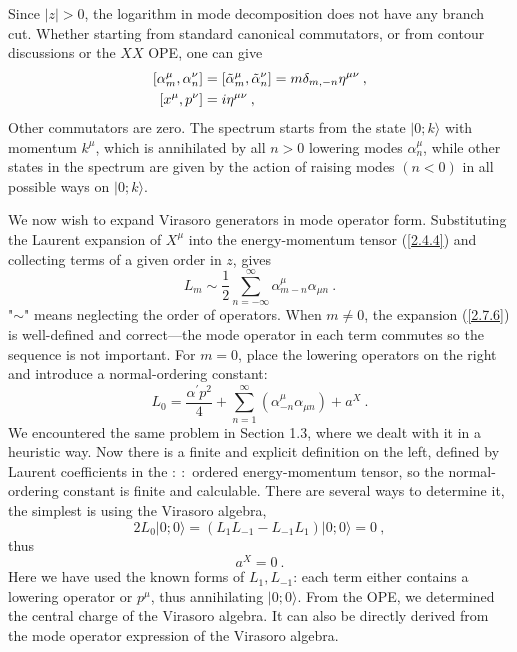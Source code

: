 Since $|z|>0$, the logarithm in mode decomposition does not have any branch cut. Whether starting from standard canonical commutators, or from contour discussions or the $XX$ OPE, one can give    
\begin{subequations} \label{2.7.5}
	\begin{align}
		[\alpha_{m}^{\mu}, \alpha_{n}^{\nu}] &= [\tilde{\alpha}_{m}^{\mu}, \tilde{\alpha}_{n}^{\nu}]=m \delta_{m,-n} \eta^{\mu \nu} \:, \label{2.7.5a} \\
		[x^{\mu}, p^{\nu}] &= i \eta^{\mu \nu} \:, \label{2.7.5b}  
	\end{align}
\end{subequations}
Other commutators are zero.    
The spectrum starts from the state $\lvert 0 ; k\rangle$ with momentum $k^\mu$, which is annihilated by all $n>0$ lowering modes $\alpha_n^\mu$, while other states in the spectrum are given by the action of raising modes $(n<0)$ in all possible ways on $\lvert 0 ; k\rangle$.    

We now wish to expand Virasoro generators in mode operator form.    
Substituting the Laurent expansion of $X^\mu$ into the energy-momentum tensor (\ref{2.4.4}) and collecting terms of a given order in $z$, gives    
\begin{equation}\label{2.7.6}
	L_{m} \sim \frac{1}{2} \sum_{n=-\infty}^{\infty} \alpha_{m-n}^{\mu} \alpha_{\mu n} \:.
\end{equation}
"$\sim$" means neglecting the order of operators. When $m\neq 0$, the expansion (\ref{2.7.6}) is well-defined and correct—the mode operator in each term commutes so the sequence is not important.    
For $m=0$, place the lowering operators on the right and introduce a normal-ordering constant:    
\begin{equation}
	L_{0}=\frac{\alpha^{\prime} p^{2}}{4}+\sum_{n=1}^{\infty}\left(\alpha_{-n}^{\mu} \alpha_{\mu n}\right)+a^{X} \:. \label{2.7.7}
\end{equation}
We encountered the same problem in Section 1.3, where we dealt with it in a heuristic way. Now there is a finite and explicit definition on the left, defined by Laurent coefficients in the $\mathrel{:\::}$ ordered energy-momentum tensor, so the normal-ordering constant is finite and calculable. There are several ways to determine it, the simplest is using the Virasoro algebra,    
\begin{equation}\label{2.7.8}
	2 L_{0}|0 ;
	0\rangle=(L_{1} L_{-1}-L_{-1} L_{1})|0 ; 0\rangle=0  \:,
\end{equation}
thus    
\begin{equation}
	a^{X}=0 \:. \label{2.7.9}
\end{equation}
Here we have used the known forms of $L_1, L_{-1}$: each term either contains a lowering operator or $p^\mu$, thus annihilating $|0 ; 0\rangle$.    
From the OPE, we determined the central charge of the Virasoro algebra. It can also be directly derived from the mode operator expression of the Virasoro algebra.    

